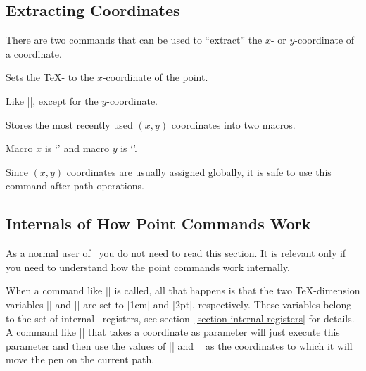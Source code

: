 \subsection{Extracting Coordinates}

There are two commands that can be used to ``extract'' the $x$- or
$y$-coordinate of a coordinate.

\begin{command}{\pgfextractx{}}
  Sets the \TeX- to the $x$-coordinate of the point.

\begin{codeexample}
\newdimen\mydim
\pgfextractx{\mydim}{\pgfpoint{2cm}{4pt}}
\end{codeexample}
\end{command}

\begin{command}{\pgfextracty{}}
  Like |\pgfextractx|, except for the $y$-coordinate.
\end{command}

\begin{command}{\pgfgetlastxy{}}
	Stores the most recently used $(x,y)$ coordinates into two macros.
\begin{codeexample}[]
\pgfpoint{2cm}{4cm}
\pgfgetlastxy{\macrox}{\macroy}
Macro $x$ is `\macrox' and macro $y$ is `\macroy'.
\end{codeexample}
	Since $(x,y)$ coordinates are usually assigned globally, it is safe to use this command after path operations.
\end{command}



\subsection{Internals of How Point Commands Work}

\label{section-internal-pointcmds}

As a normal user of \pgfname\ you do not need to read this section. It
is relevant only if you need to understand how the point commands work
internally.

When a command like |\pgfpoint{1cm}{2pt}| is called, all that happens
is that the two \TeX-dimension variables |\pgf@x| and |\pgf@y| are set
to |1cm| and |2pt|, respectively. These variables belong to the set of
internal \pgfname\ registers, see section~\ref{section-internal-registers}
for details. A command like |\pgfpathmoveto| that
takes a coordinate as parameter will just execute this parameter and
then use the values of |\pgf@x| and |\pgf@y| as the coordinates to
which it will move the pen on the current path.

